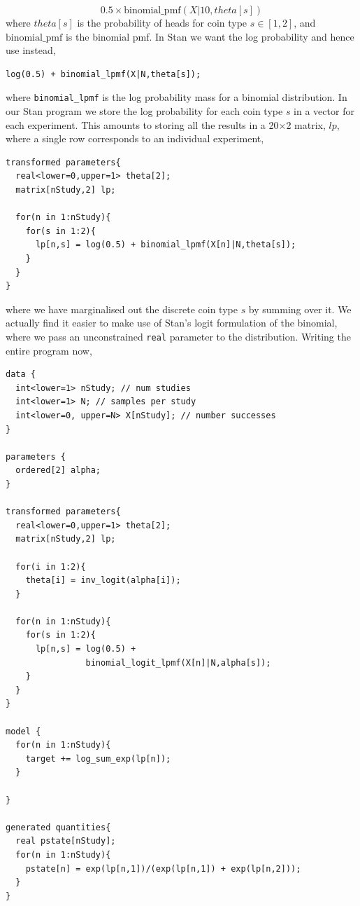 \documentclass[11pt,fullpage]{book}
\begin{document}
\begin{equation}
0.5 \times \text{binomial}\_\text{pmf}(X|10,theta[s])
\end{equation}
%
where $theta[s]$ is the probability of heads for coin type $s\in[1,2]$, and $\text{binomial}\_\text{pmf}$ is the binomial pmf. In Stan we want the log probability and hence use instead,

\begin{verbatim}
log(0.5) + binomial_lpmf(X|N,theta[s]);
\end{verbatim}

where \texttt{binomial_lpmf} is the log probability mass for a binomial distribution. In our Stan program we store the log probability for each coin type $s$ in a vector for each experiment. This amounts to storing all the results in a 20$\times$2 matrix, $lp$, where a single row corresponds to an individual experiment,

\begin{verbatim}
transformed parameters{
  real<lower=0,upper=1> theta[2];
  matrix[nStudy,2] lp;
  
  for(n in 1:nStudy){
    for(s in 1:2){
      lp[n,s] = log(0.5) + binomial_lpmf(X[n]|N,theta[s]);
    }
  }
}
\end{verbatim}

where we have marginalised out the discrete coin type $s$ by summing over it. We actually find it easier to make use of Stan's logit formulation of the binomial, where we pass an unconstrained \texttt{real} parameter to the distribution. Writing the entire program now,

\begin{verbatim}
data { 
  int<lower=1> nStudy; // num studies
  int<lower=1> N; // samples per study
  int<lower=0, upper=N> X[nStudy]; // number successes
} 

parameters { 
  ordered[2] alpha; 
}

transformed parameters{
  real<lower=0,upper=1> theta[2];
  matrix[nStudy,2] lp;
  
  for(i in 1:2){
    theta[i] = inv_logit(alpha[i]);
  }
  
  for(n in 1:nStudy){
    for(s in 1:2){
      lp[n,s] = log(0.5) + 
                binomial_logit_lpmf(X[n]|N,alpha[s]);
    }
  }
}

model { 
  for(n in 1:nStudy){
    target += log_sum_exp(lp[n]);
  }
  
}

generated quantities{
  real pstate[nStudy];
  for(n in 1:nStudy){
    pstate[n] = exp(lp[n,1])/(exp(lp[n,1]) + exp(lp[n,2]));
  }
}
\end{verbatim}
\end{document}

